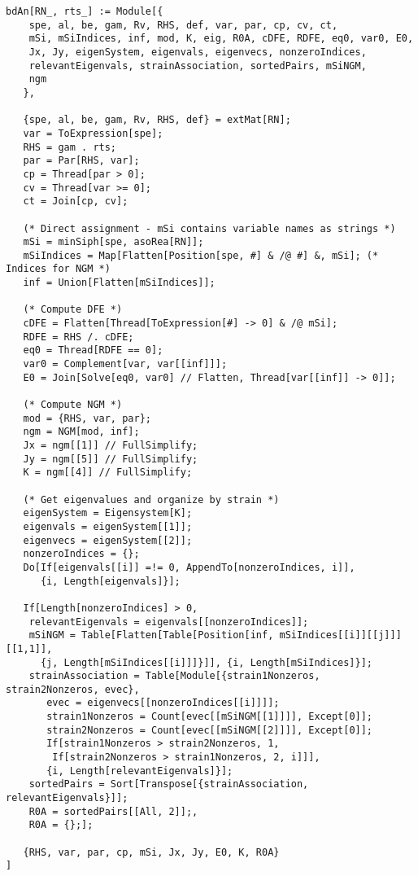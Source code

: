 \documentclass{article}
\begin{document}
\begin{lstlisting}
bdAn[RN_, rts_] := Module[{
    spe, al, be, gam, Rv, RHS, def, var, par, cp, cv, ct,
    mSi, mSiIndices, inf, mod, K, eig, R0A, cDFE, RDFE, eq0, var0, E0,
    Jx, Jy, eigenSystem, eigenvals, eigenvecs, nonzeroIndices,
    relevantEigenvals, strainAssociation, sortedPairs, mSiNGM,
    ngm
   },

   {spe, al, be, gam, Rv, RHS, def} = extMat[RN];
   var = ToExpression[spe];
   RHS = gam . rts;
   par = Par[RHS, var];
   cp = Thread[par > 0];
   cv = Thread[var >= 0];
   ct = Join[cp, cv];

   (* Direct assignment - mSi contains variable names as strings *)
   mSi = minSiph[spe, asoRea[RN]];
   mSiIndices = Map[Flatten[Position[spe, #] & /@ #] &, mSi]; (* Indices for NGM *)
   inf = Union[Flatten[mSiIndices]];

   (* Compute DFE *)
   cDFE = Flatten[Thread[ToExpression[#] -> 0] & /@ mSi];
   RDFE = RHS /. cDFE;
   eq0 = Thread[RDFE == 0];
   var0 = Complement[var, var[[inf]]];
   E0 = Join[Solve[eq0, var0] // Flatten, Thread[var[[inf]] -> 0]];

   (* Compute NGM *)
   mod = {RHS, var, par};
   ngm = NGM[mod, inf];
   Jx = ngm[[1]] // FullSimplify;
   Jy = ngm[[5]] // FullSimplify;
   K = ngm[[4]] // FullSimplify;

   (* Get eigenvalues and organize by strain *)
   eigenSystem = Eigensystem[K];
   eigenvals = eigenSystem[[1]];
   eigenvecs = eigenSystem[[2]];
   nonzeroIndices = {};
   Do[If[eigenvals[[i]] =!= 0, AppendTo[nonzeroIndices, i]],
      {i, Length[eigenvals]}];

   If[Length[nonzeroIndices] > 0,
    relevantEigenvals = eigenvals[[nonzeroIndices]];
    mSiNGM = Table[Flatten[Table[Position[inf, mSiIndices[[i]][[j]]][[1,1]],
      {j, Length[mSiIndices[[i]]]}]], {i, Length[mSiIndices]}];
    strainAssociation = Table[Module[{strain1Nonzeros, strain2Nonzeros, evec},
       evec = eigenvecs[[nonzeroIndices[[i]]]];
       strain1Nonzeros = Count[evec[[mSiNGM[[1]]]], Except[0]];
       strain2Nonzeros = Count[evec[[mSiNGM[[2]]]], Except[0]];
       If[strain1Nonzeros > strain2Nonzeros, 1,
        If[strain2Nonzeros > strain1Nonzeros, 2, i]]],
       {i, Length[relevantEigenvals]}];
    sortedPairs = Sort[Transpose[{strainAssociation, relevantEigenvals}]];
    R0A = sortedPairs[[All, 2]];,
    R0A = {};];

   {RHS, var, par, cp, mSi, Jx, Jy, E0, K, R0A}
]
\end{lstlisting}
\end{document}
